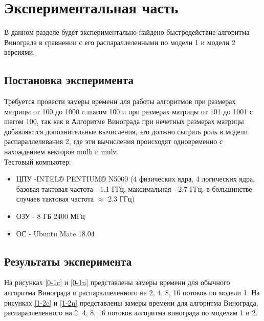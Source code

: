 \documentclass[a4paper, 14pt]{article}
\begin{document}
    
       	\newpage
       	
        \section{Экспериментальная часть}
		В данном разделе будет экспериментально найдено быстродействие алгоритма Винограда в сравнении с его распараллеленными по модели 1 и модели 2 версиями.
		\subsection{Постановка эксперимента}
		\parindent=1cm
		Требуется провести замеры времени для работы алгоритмов при размерах матрицы от 100 до 1000 c шагом 100 и при размерах матрицы от 101 до 1001 с шагом 100, так как в Алгоритме Винограда при нечетных размерах матрицы добавляются дополнительные вычисления, это должно сыграть роль в модели распараллеливания 2, где эти вычисления происходят одновременно с нахождением векторов mulh и mulv.\\
		
		
		Тестовый компьютер:
		\begin{itemize}
			\item ЦПУ -INTEL® PENTIUM® N5000 (4 физических ядра, 4 логических ядра, базовая тактовая частота - 1.1 ГГц, максимальная - 2.7 ГГц, в большинстве случаев тактовая частота $\approx$ 2.3 ГГц)\cite{intel}
			\item ОЗУ - 8 ГБ 2400 МГц
			\item ОС - Ubuntu Mate 18.04
		\end{itemize}
		\subsection{Результаты эксперимента}
		На рисунках \ref{0-1c} и \ref{0-1n} представлены замеры времени для обычного алгоритма Винограда и распараллеленного на 2, 4, 8, 16 потоков по модели 1. На рисунках \ref{1-2c} и \ref{1-2n} представлены замеры времени для алгоритма Винограда, распараллеленного на 2, 4, 8, 16 потоков алгоритма винограда по моделям 1 и 2.
\end{document}
